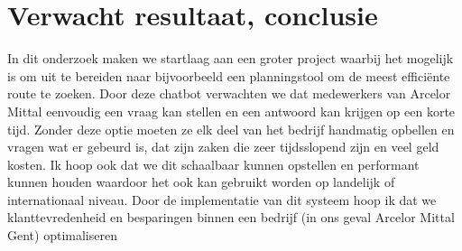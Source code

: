 





\section{Verwacht resultaat, conclusie}%
\label{sec:verwachte_resultaten}
In dit onderzoek maken we startlaag aan een groter project waarbij het mogelijk is om uit te bereiden naar bijvoorbeeld een planningstool om de meest efficiënte route te zoeken.
Door deze chatbot verwachten we dat medewerkers van Arcelor Mittal eenvoudig een vraag kan stellen en een antwoord kan krijgen op een korte tijd.
Zonder deze optie moeten ze elk deel van het bedrijf handmatig opbellen en vragen wat er gebeurd is, dat zijn zaken die zeer tijdsslopend zijn en veel geld kosten.
Ik hoop ook dat we dit schaalbaar kunnen opstellen en performant kunnen houden waardoor het ook kan gebruikt worden op landelijk of internationaal niveau.
Door de implementatie van dit systeem hoop ik dat we klanttevredenheid en besparingen binnen een bedrijf (in ons geval Arcelor Mittal Gent) optimaliseren


